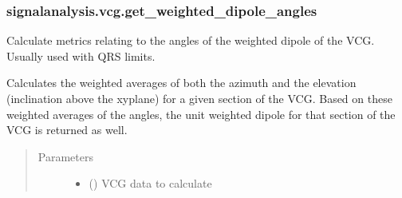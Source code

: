 \documentclass[letterpaper,10pt,english]{sphinxmanual}
\begin{document}
\subsubsection{signalanalysis.vcg.get\_weighted\_dipole\_angles}
\label{\detokenize{_autosummary/signalanalysis.vcg.get_weighted_dipole_angles:signalanalysis-vcg-get-weighted-dipole-angles}}\label{\detokenize{_autosummary/signalanalysis.vcg.get_weighted_dipole_angles::doc}}

\begin{fulllineitems}
\label{\detokenize{_autosummary/signalanalysis.vcg.get_weighted_dipole_angles:signalanalysis.vcg.get_weighted_dipole_angles}}
\sphinxAtStartPar
Calculate metrics relating to the angles of the weighted dipole of the VCG. Usually used with QRS limits.

\sphinxAtStartPar
Calculates the weighted averages of both the azimuth and the elevation (inclination above the xy\sphinxhyphen{}plane) for a
given section of the VCG. Based on these weighted averages of the angles, the unit weighted dipole for that
section of the VCG is returned as well.
\begin{quote}\begin{description}
\item[{Parameters}] \leavevmode\begin{itemize}
\item {} 
\sphinxAtStartPar
{} () \textendash{} VCG data to calculate


\end{itemize}
\end{description}
\end{quote}
\end{fulllineitems}
\end{document}
